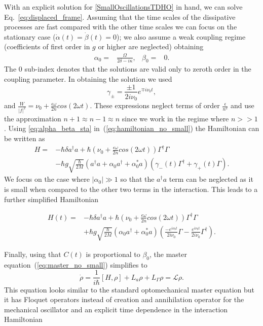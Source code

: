 \documentclass[reprint, amsmath,amssymb, aps,pra]{revtex4-1}
\begin{document}
With an explicit solution for \eqref{SmallOscillationsTDHO} in hand,
we can solve Eq.~\eqref{eq:displaced_frame}. Assuming that the time
scales of the dissipative processes are fast compared with the other
time scales we can focus on the stationary case
($\dot{\alpha}(t)=\dot{\beta}(t)=0$); we also assume a weak coupling
regime (coefficients of first order in $g$ or higher are neglected)
obtaining
\begin{align}\label{eq:alpha_beta_sta}
\alpha_0 =& \frac{\Omega}{2\delta-i\kappa},& \beta_0 =& 0.
\end{align}
The 0 sub-index denotes that the solutions are valid only to zeroth
order in the coupling parameter. In obtaining the solution we used
\begin{equation}\label{GammaCoefficients}
\gamma_\pm= \frac{\pm 1}{2i\nu_0}e^{\mp i\nu_0 t},
\end{equation}
and  $\frac{W}{|f|^2} = \nu_0 + \frac{\epsilon \omega}{2n} cos(2\omega t)$. These expressions neglect terms of order $\frac{\epsilon}{n^2}$ and use the approximation $n+1 \approx n-1 \approx n$ since we work in the regime where $n >> 1$. Using \eqref{eq:alpha_beta_sta} in~(\ref{eq:hamiltonian_no_small})
the Hamiltonian can be written as
\begin{align}
H =& -\hbar \delta a^{\dagger}a +\hbar(\nu_0 + \frac{\epsilon \omega}{2n} cos(2\omega t))\Gamma^{\dagger}\Gamma \\
&-\hbar g\sqrt{\frac{\hbar}{2M}}(a^{\dagger}a +\alpha_0 a^{\dagger}+\alpha^*_0 a)(\gamma_-(t)\Gamma^{\dagger}+\gamma_+(t)\Gamma)\nonumber.
\end{align}
We focus on the case where $|\alpha_0| \gg 1$
\cite{BarberisLC} so that the $a^\dagger a$ term can be neglected as
it is small when compared to the other two terms in the interaction.
This leads to a further simplified Hamiltonian

\begin{align} \label{LCHamiltonian}
H(t) =& -\hbar \delta a^{\dagger}a +\hbar(\nu_0 + \frac{\epsilon \omega}{2n} cos(2\omega t))\Gamma^{\dagger}\Gamma \\
&+\hbar g\sqrt{\frac{\hbar}{2M}}(\alpha_0 a^{\dagger}+\alpha^*_0 a)(\frac{-e^{i\nu_0 t}}{2i\nu_0}\Gamma-\frac{
e^{i\nu_0 t}}{2i\nu_0} \nonumber\Gamma^{\dagger}).
\end{align}

Finally, using that $C(t)$ is proportional to $\beta_0$, the master
equation~(\ref{eq:master_no_small}) simplifies to
\begin{equation}\label{LCMasterEq}
\dot{\rho} = \frac{1}{i\hbar}[H,\rho] +L_a\rho + L_\Gamma \rho = \mathcal{L}\rho.
\end{equation}
This equation looks similar to the standard optomechanical master
equation but it has Floquet operators instead of creation and
annihilation operator for the mechanical oscillator and an explicit
time dependence in the interaction Hamiltonian
\end{document}
